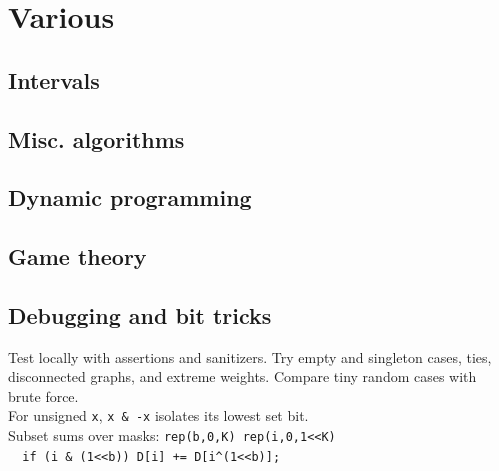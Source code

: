 \chapter{Various}

\section{Intervals}

\section{Misc. algorithms}

\section{Dynamic programming}

\section{Game theory}
	

\section{Debugging and bit tricks}
{\footnotesize
Test locally with assertions and sanitizers. Try empty and singleton
cases, ties, disconnected graphs, and extreme weights. Compare tiny
random cases with brute force.\\
For unsigned \verb|x|, \verb|x & -x| isolates its lowest set bit.\\
Subset sums over masks:
\verb|rep(b,0,K) rep(i,0,1<<K)|\\
\verb|  if (i & (1<<b)) D[i] += D[i^(1<<b)];|
}
